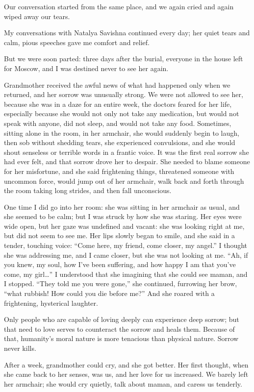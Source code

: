 Our conversation started from the same place, and we again cried and again wiped away our tears.

My conversations with Natalya Savishna continued every day; her quiet tears and calm, pious speeches gave me comfort and relief.

But we were soon parted: three days after the burial, everyone in the house left for Moscow, and I was destined never to see her again.

Grandmother received the awful news of what had happened only when we returned, and her sorrow was unusually strong. We were not allowed to see her, because she was in a daze for an entire week, the doctors feared for her life, especially because she would not only not take any medication, but would not speak with anyone, did not sleep, and would not take any food. Sometimes, sitting alone in the room, in her armchair, she would suddenly begin to laugh, then sob without shedding tears, she experienced convulsions, and she would shout senseless or terrible words in a frantic voice. It was the first real sorrow she had ever felt, and that sorrow drove her to despair. She needed to blame someone for her misfortune, and she said frightening things, threatened someone with uncommon force, would jump out of her armchair, walk back and forth through the room taking long strides, and then fall unconscious.

One time I did go into her room: she was sitting in her armchair as usual, and she seemed to be calm; but I was struck by how she was staring. Her eyes were wide open, but her gaze was undefined and vacant: she was looking right at me, but did not seem to see me. Her lips slowly began to smile, and she said in a tender, touching voice: ``Come here, my friend, come closer, my angel.'' I thought she was addressing me, and I came closer, but she was not looking at me. ``Ah, if you knew, my soul, how I've been suffering, and how happy I am that you've come, my girl\ldots{}'' I understood that she imagining that she could see maman, and I stopped. ``They told me you were gone,'' she continued, furrowing her brow, ``what rubbish! How could you die before me?'' And she roared with a frightening, hysterical laughter.

Only people who are capable of loving deeply can experience deep sorrow; but that need to love serves to counteract the sorrow and heals them. Because of that, humanity's moral nature is more tenacious than physical nature. Sorrow never kills.

After a week, grandmother could cry, and she got better. Her first thought, when she came back to her senses, was us, and her love for us increased. We barely left her armchair; she would cry quietly, talk about maman, and caress us tenderly.

